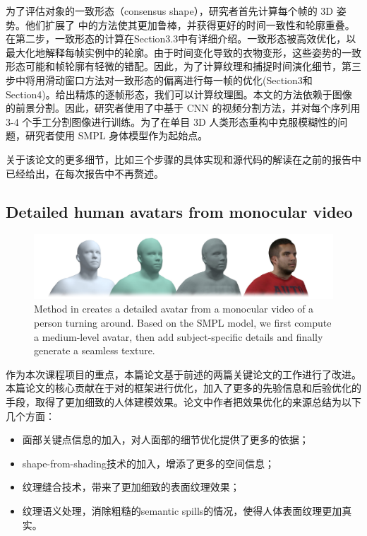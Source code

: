 \documentclass{article}
\begin{document}
为了评估对象的一致形态（consensus shape），研究者首先计算每个帧的 3D 姿势。他们扩展了 \cite{keepitsmpl}中的方法使其更加鲁棒，并获得更好的时间一致性和轮廓重叠。在第二步，一致形态的计算在Section3.3中有详细介绍。一致形态被高效优化，以最大化地解释每帧实例中的轮廓。由于时间变化导致的衣物变形，这些姿势的一致形态可能和帧轮廓有轻微的错配。因此，为了计算纹理和捕捉时间演化细节，第三步中将用滑动窗口方法对一致形态的偏离进行每一帧的优化(Section3和Section4)。给出精炼的逐帧形态，我们可以计算纹理图。本文的方法依赖于图像的前景分割。因此，研究者使用了\cite{oneshotseg}中基于 CNN 的视频分割方法，并对每个序列用 3-4 个手工分割图像进行训练。为了在单目 3D 人类形态重构中克服模糊性的问题，研究者使用 SMPL 身体模型\cite{smpl}作为起始点。

关于该论文的更多细节，比如三个步骤的具体实现和源代码的解读在之前的报告中已经给出，在每次报告中不再赘述。

\subsection{Detailed human avatars from monocular video}
\begin{figure}[H]
    \centering
    \includegraphics[width=16cm]{figure/paper2.png}
    \caption{Method in \cite{paper2} creates a detailed avatar from a monocular video of a person turning around. Based on the SMPL model, we first compute a medium-level avatar, then add subject-specific details and finally generate a seamless texture.}
    \label{paper2_titlefigure}
\end{figure}

作为本次课程项目的重点，本篇论文基于前述的两篇关键论文的工作进行了改进。本篇论文的核心贡献在于对\cite{paper2}的框架进行优化，加入了更多的先验信息和后验优化的手段，取得了更加细致的人体建模效果。论文中作者把效果优化的来源总结为以下几个方面：
\begin{itemize}
	\item 面部关键点信息的加入，对人面部的细节优化提供了更多的依据；
	\item shape-from-shading技术的加入，增添了更多的空间信息；
	\item 纹理缝合技术，带来了更加细致的表面纹理效果；
	\item 纹理语义处理，消除粗糙的semantic spills的情况，使得人体表面纹理更加真实。
\end{itemize}
\end{document}
